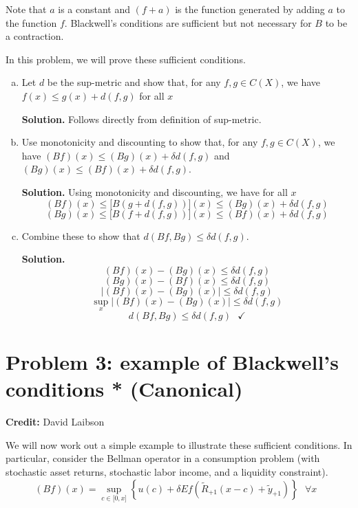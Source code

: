 \documentclass[11pt]{extarticle}
\theoremstyle{plain}
\theoremstyle{definition}
\begin{document}
\noindent
Note that $a$ is a constant and $(f+a)$ is the function generated by adding $a$ to the function $f$. Blackwell's conditions are sufficient but not necessary for $B$ to be a contraction.

\vspace{10mm}
\noindent
In this problem, we will prove these sufficient conditions.
\begin{enumerate}[(a)]
\item Let $d$ be the sup-metric and show that, for any $f, g \in C(X)$, we have $f(x) \leq g(x) + d(f, g)$ for all $x$

\textbf{Solution.} Follows directly from definition of sup-metric.

\item Use monotonicity and discounting to show that, for any $f, g \in C(X)$, we have $(Bf)(x) \leq (Bg)(x) + \delta d(f, g)$ and $(Bg)(x) \leq (Bf)(x) + \delta d(f, g)$. 

\textbf{Solution.} Using monotonicity and discounting, we have for all $x$
\[
\left( Bf\right) (x)\leq \lbrack B(g+d(f,g))](x)\leq \left( Bg\right)
(x)+\delta d(f,g) 
\]
\[
\left( Bg\right) (x)\leq \lbrack B(f+d(f,g))](x)\leq \left( Bf\right) \left(
x\right) +\delta d(f,g) 
\]

\item Combine these to show that $d(Bf, Bg) \leq \delta d(f, g)$. 

\textbf{Solution.}
\[
\left( Bf\right) \left( x\right) -\left( Bg\right) \left( x\right) \leq
\delta d(f,g) 
\]%
\[
\left( Bg\right) \left( x\right) -\left( Bf\right) \left( x\right) \leq
\delta d(f,g) 
\]%
\[
\left\vert (Bf)(x)-(Bg)(x)\right\vert \leq \delta d(f,g) 
\]%
\[
\sup_{x}\left\vert (Bf)(x)-(Bg)(x)\right\vert \leq \delta d(f,g) 
\]%
\[
d(Bf,Bg)\leq \delta d(f,g)\text{ \ \ \ }\checkmark 
\]%
\end{enumerate}



\vspace{10mm}
\section*{Problem 3: example of Blackwell's conditions * (Canonical)}

\textbf{Credit:} David Laibson

\vspace{5mm}
\noindent
We will now work out a simple example to illustrate these sufficient conditions. In particular, consider the Bellman operator in a consumption problem (with stochastic asset returns, stochastic labor income, and a liquidity constraint). 
\begin{equation*}
	(Bf)(x)=\sup_{c\in \lbrack 0,x]}\left\{ u(c)+\delta Ef(\tilde{R}_{+1}(x-c)+%
	\tilde{y}_{+1})\right\} \text{ \ }\forall x\text{\ } 
\end{equation*}
\end{document}
